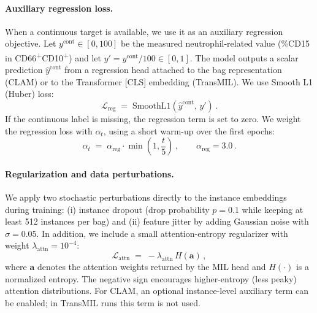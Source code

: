 \paragraph{Auxiliary regression loss.}
When a continuous target is available, we use it as an auxiliary regression objective. Let $y^{\text{cont}}\in[0,100]$ be the measured neutrophil-related value (\%CD15 in CD66\textsuperscript{+}CD10\textsuperscript{+}) and let $y' = y^{\text{cont}}/100 \in [0,1]$. The model outputs a scalar prediction $\hat{y}^{\text{cont}}$ from a regression head attached to the bag representation (CLAM) or to the Transformer [CLS] embedding (TransMIL). We use Smooth L1 (Huber) loss:
\begin{equation}\label{eq:reg_huber}
\mathcal{L}_{\text{reg}} \;=\; \mathrm{SmoothL1}\!\left(\hat{y}^{\text{cont}},\, y'\right)\,.
\end{equation}
If the continuous label is missing, the regression term is set to zero. We weight the regression loss with $\alpha_t$, using a short warm-up over the first epochs:
\begin{equation}\label{eq:alpha_warmup}
\alpha_t \;=\; \alpha_{\text{reg}} \cdot \min\!\left(1,\frac{t}{5}\right)\,,
\qquad \alpha_{\text{reg}} = 3.0\,.
\end{equation}

\paragraph{Regularization and data perturbations.}
We apply two stochastic perturbations directly to the instance embeddings during training: (i) instance dropout (drop probability $p=0.1$ while keeping at least 512 instances per bag) and (ii) feature jitter by adding Gaussian noise with $\sigma=0.05$. In addition, we include a small attention-entropy regularizer with weight $\lambda_{\text{attn}}=10^{-4}$:
\begin{equation}\label{eq:attn_entropy}
\mathcal{L}_{\text{attn}} \;=\; -\lambda_{\text{attn}}\, H(\mathbf{a})\,,
\end{equation}
where $\mathbf{a}$ denotes the attention weights returned by the MIL head and $H(\cdot)$ is a normalized entropy. The negative sign encourages higher-entropy (less peaky) attention distributions. For CLAM, an optional instance-level auxiliary term can be enabled; in TransMIL runs this term is not used.

